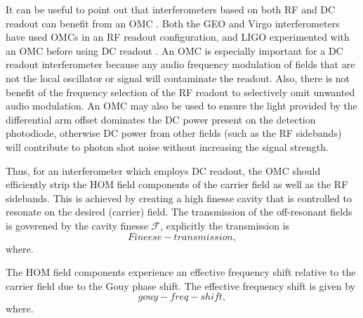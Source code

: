 It can be useful to point out that interferometers based on both RF and DC readout can benefit from an OMC . %
Both the GEO and Virgo interferometers have used OMCs in an RF readout configuration, and LIGO experimented with an OMC before using DC readout \cite{some things}. %
An OMC is especially important for a DC readout interferometer because any audio frequency modulation of fields that are not the local oscillator or signal will contaminate the readout. %
Also, there is not benefit of the frequency selection of the RF readout to selectively omit unwanted audio modulation. %
An OMC may also be used to ensure the light provided by the differential arm offset dominates the DC power present on the detection photodiode, otherwise DC power from other fields (such as the RF sidebands) will contribute to photon shot noise without increasing the signal strength. %


Thus, for an interferometer which employs DC readout, the OMC should efficiently strip the HOM field components of the carrier field as well as the RF sidebands. %
This is achieved by creating a high finesse cavity that is controlled to resonate on the desired (carrier) field. %
The transmission of the off-resonant fields is goverened by the cavity finesse $\mathcal{F}$, explicitly the transmission is
\begin{equation}
Fineese-transmission,
\end{equation}
where.

The HOM field components experience an effective frequency shift relative to the  carrier field due to the Gouy phase shift. %
The effective frequency shift is given by
\begin{equation}
\label{eqn:gouyshift}
gouy-freq-shift,
\end{equation}
where. %



